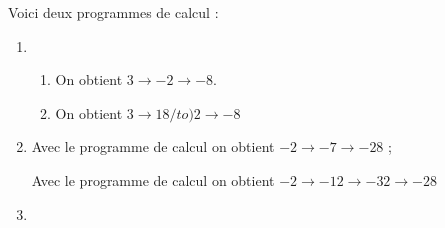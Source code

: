 
\medskip
 
Voici deux programmes de calcul : 

\medskip

%

\begin{enumerate}
\item 
	\begin{enumerate}
		\item %
		On obtient $3 \to - 2 \to - 8$.
		\item %
On obtient $3 \to 18 /to ) 2 \to - 8$
	\end{enumerate}
\item %
Avec le programme de calcul  on obtient $- 2 \to - 7 \to - 28$ ;

Avec le programme de calcul  on obtient $- 2 \to - 12 \to - 32 \to - 28$ 
\item %



\end{enumerate}
